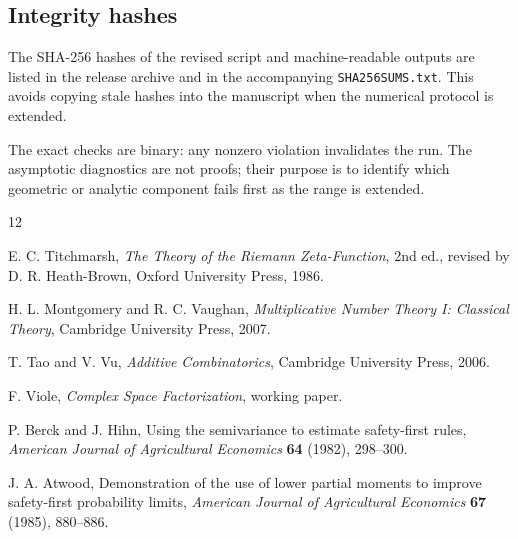 \documentclass[11pt]{article}
\theoremstyle{definition}
\theoremstyle{remark}
\newcommand{\1}{\mathbf{1}}
\begin{document}
\subsection{Integrity hashes}

The SHA-256 hashes of the revised script and machine-readable outputs
are listed in the release archive and in the accompanying
\texttt{SHA256SUMS.txt}.  This avoids copying stale hashes into the
manuscript when the numerical protocol is extended.

The exact checks are binary: any nonzero violation invalidates the run.
The asymptotic diagnostics are not proofs; their purpose is to identify
which geometric or analytic component fails first as the range is
extended.

\begin{thebibliography}{12}

E. C. Titchmarsh,
\emph{The Theory of the Riemann Zeta-Function},
2nd ed., revised by D. R. Heath-Brown,
Oxford University Press, 1986.

H. L. Montgomery and R. C. Vaughan,
\emph{Multiplicative Number Theory I: Classical Theory},
Cambridge University Press, 2007.

T. Tao and V. Vu,
\emph{Additive Combinatorics},
Cambridge University Press, 2006.

F. Viole,
\emph{Complex Space Factorization},
working paper.

P. Berck and J. Hihn,
Using the semivariance to estimate safety-first rules,
\emph{American Journal of Agricultural Economics} \textbf{64} (1982), 298--300.

J. A. Atwood,
Demonstration of the use of lower partial moments to improve safety-first probability limits,
\emph{American Journal of Agricultural Economics} \textbf{67} (1985), 880--886.

\end{thebibliography}
\end{document}
